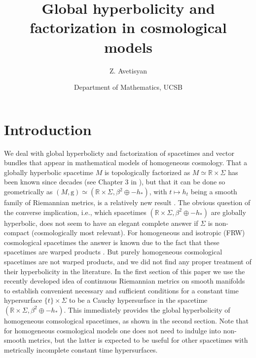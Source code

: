 \documentclass{article}
\title{Global hyperbolicity and factorization in cosmological models}
\author{Z. Avetisyan}
\date{Department of Mathematics, UCSB}
\begin{document}
\maketitle


\section*{Introduction}

We deal with global hyperbolicty and factorization of spacetimes and vector bundles that appear in mathematical models of homogeneous cosmology. That a globally hyperbolic spacetime $M$ is topologically factorized as $M\simeq\mathbb{R}\times\Sigma$ has been known since decades (see Chapter 3 in \cite{BeemEhrlichEasley}), but that it can be done so geometrically as $(M,\mathrm{g})\simeq(\mathbb{R}\times\Sigma,\beta^2\oplus-h_*)$, with $t\mapsto h_t$ being a smooth family of Riemannian metrics, is a relatively new result \cite{BernalSanchez2005}. The obvious question of the converse implication, i.e., which spacetimes $(\mathbb{R}\times\Sigma,\beta^2\oplus-h_*)$ are globally hyperbolic, does not seem to have an elegant complete answer if $\Sigma$ is non-compact (cosmologically most relevant). For homogeneous and isotropic (FRW) cosmological spacetimes the answer is known due to the fact that these spacetimes are warped products \cite{BeemEhrlichEasley}. But purely homogeneous cosmological spacetimes are not warped products, and we did not find any proper treatment of their hyperbolicity in the literature. In the first section of this paper we use the recently developed idea of continuous Riemannian metrics on smooth manifolds to establish convenient necessary and sufficient conditions for a constant time hypersurface $\{t\}\times\Sigma$ to be a Cauchy hypersurface in the spacetime $(\mathbb{R}\times\Sigma,\beta^2\oplus-h_*)$. This immediately provides the global hyperbolicity of homogeneous comsological spacetimes, as shown in the second section. Note that for homogeneous cosmological models one does not need to indulge into non-smooth metrics, but the latter is expected to be useful for other spacetimes with metrically incomplete constant time hypersurfaces.
\end{document}
